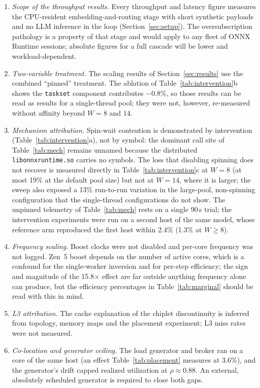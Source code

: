\documentclass[conference]{IEEEtran}
\begin{document}
\begin{enumerate}
\item \emph{Scope of the throughput results.} Every throughput and latency figure measures the CPU-resident embedding-and-routing stage with short synthetic payloads and no LLM inference in the loop (Section~\ref{sec:setup}). The oversubscription pathology is a property of that stage and would apply to any fleet of ONNX Runtime sessions; absolute figures for a full cascade will be lower and workload-dependent.
\item \emph{Two-variable treatment.} The scaling results of Section~\ref{sec:results} use the combined ``pinned'' treatment. The ablation of Table~\ref{tab:intervention}b shows the \texttt{taskset} component contributes $-0.8\%$, so those results can be read as results for a single-thread pool; they were not, however, re-measured without affinity beyond $W{=}8$ and $14$.
\item \emph{Mechanism attribution.} Spin-wait contention is demonstrated by intervention (Table~\ref{tab:intervention}a), not by symbol: the dominant call site of Table~\ref{tab:mech} remains unnamed because the distributed \texttt{libonnxruntime.so} carries no symbols. The loss that disabling spinning does not recover is measured directly in Table~\ref{tab:intervention}c at $W{=}8$ (at most 19\% at the default pool size) but not at $W{=}14$, where it is larger; the sweep also exposed a 13\% run-to-run variation in the large-pool, non-spinning configuration that the single-thread configurations do not show. The unpinned telemetry of Table~\ref{tab:mech} rests on a single 90\,s trial; the intervention experiments were run on a second host of the same model, whose reference arm reproduced the first host within 2.4\% (1.3\% at $W\geq8$).
\item \emph{Frequency scaling.} Boost clocks were not disabled and per-core frequency was not logged. Zen~5 boost depends on the number of active cores, which is a confound for the single-worker inversion and for per-step efficiency; the sign and magnitude of the 15.8$\times$ effect are far outside anything frequency alone can produce, but the efficiency percentages in Table~\ref{tab:marginal} should be read with this in mind.
\item \emph{L3 attribution.} The cache explanation of the chiplet discontinuity is inferred from topology, memory maps and the placement experiment; L3 miss rates were not measured.
\item \emph{Co-location and generator ceiling.} The load generator and broker ran on a core of the same host (an effect Table~\ref{tab:placement} measures at 3.6\%), and the generator's drift capped realized utilization at $\rho\approx0.88$. An external, absolutely scheduled generator is required to close both gaps.

\end{enumerate}
\end{document}
